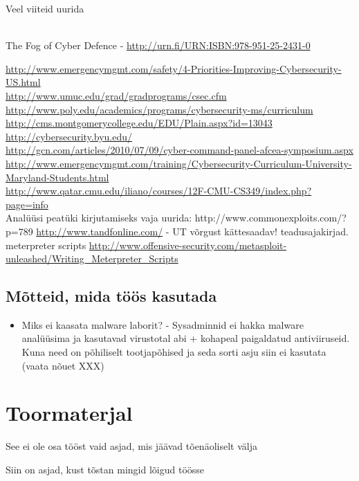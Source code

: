Veel viiteid uurida 
{\scriptsize
\\

The Fog of Cyber Defence - \url{http://urn.fi/URN:ISBN:978-951-25-2431-0}

\url{http://www.emergencymgmt.com/safety/4-Priorities-Improving-Cybersecurity-US.html}\\
\url{http://www.umuc.edu/grad/gradprograms/csec.cfm}
\\
\url{http://www.poly.edu/academics/programs/cybersecurity-ms/curriculum}\\
\url{http://cms.montgomerycollege.edu/EDU/Plain.aspx?id=13043}\\
\url{http://cybersecurity.byu.edu/}\\
\url{http://gcn.com/articles/2010/07/09/cyber-command-panel-afcea-symposium.aspx}\\
\url{http://www.emergencymgmt.com/training/Cybersecurity-Curriculum-University-Maryland-Students.html}\\
\url{http://www.qatar.cmu.edu/iliano/courses/12F-CMU-CS349/index.php?page=info}\\
{\color{red} Analüüsi peatüki kirjutamiseks vaja uurida:}
http://www.commonexploits.com/?p=789
\url{http://www.tandfonline.com/} - UT võrgust kättesaadav! teadusajakirjad.
meterpreter scripts \url{http://www.offensive-security.com/metasploit-unleashed/Writing_Meterpreter_Scripts}
}


\section{Mõtteid, mida töös kasutada}

\begin{itemize}
\item Miks ei kaasata malware laborit? - Sysadminnid ei hakka malware analüüsima ja kasutavad virustotal abi + kohapeal paigaldatud antiviiruseid. Kuna need on põhiliselt tootjapõhised ja seda sorti asju siin ei kasutata (vaata nõuet XXX)
\end{itemize}




\chapter{Toormaterjal}
{\color{red} See ei ole osa tööst vaid asjad, mis jäävad tõenäoliselt välja}


Siin on asjad, kust tõstan mingid lõigud töösse

